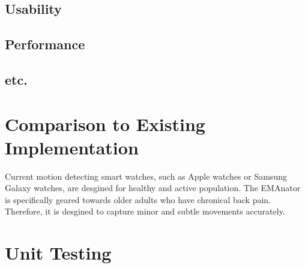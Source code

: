 \documentclass[12pt, titlepage]{article}
\begin{document}
\subsection{Usability}
		
\subsection{Performance}

\subsection{etc.}
	
\section{Comparison to Existing Implementation}	

Current motion detecting smart watches, such as Apple watches or Samsung Galaxy watches, are desgined for healthy and active population. The EMAnator is specifically geared towards older adults who have chronical back pain. Therefore, it is desgined to capture minor and subtle movements accurately.

\section{Unit Testing}
\end{document}
